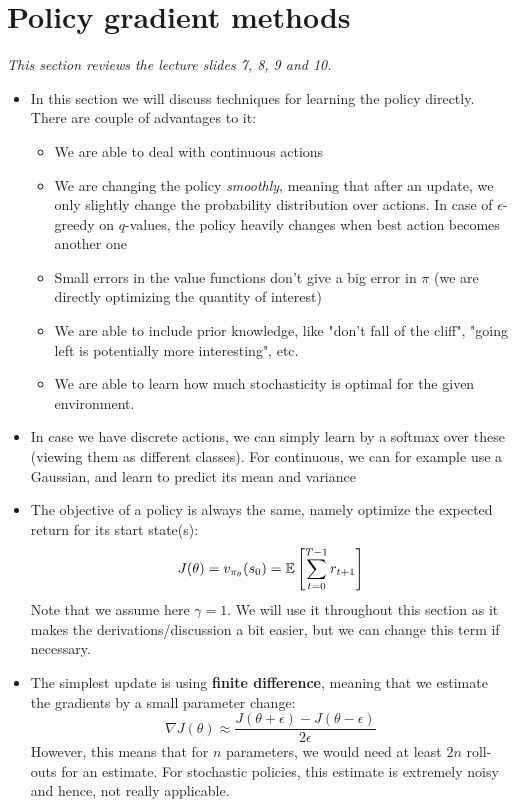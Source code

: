 \section{Policy gradient methods}
\label{sec:policy_learning}
\textit{This section reviews the lecture slides 7, 8, 9 and 10.}
\begin{itemize}
	\item In this section we will discuss techniques for learning the policy directly. There are couple of advantages to it:
	\begin{itemize}
		\item We are able to deal with continuous actions
		\item We are changing the policy \textit{smoothly}, meaning that after an update, we only slightly change the probability distribution over actions. In case of $\epsilon$-greedy on $q$-values, the policy heavily changes when best action becomes another one
		\item Small errors in the value functions don't give a big error in $\pi$ (we are directly optimizing the quantity of interest)
		\item We are able to include prior knowledge, like "don't fall of the cliff", "going left is potentially more interesting", etc.
		\item We are able to learn how much stochasticity is optimal for the given environment. 
	\end{itemize}
	\item In case we have discrete actions, we can simply learn by a softmax over these (viewing them as different classes). For continuous, we can for example use a Gaussian, and learn to predict its mean and variance
	\item The objective of a policy is always the same, namely optimize the expected return for its start state(s): $$J(\theta)=v_{\pi_{\theta}}(s_0)=\mathbb{E}\left[\sum_{t=0}^{T-1} r_{t+1}\right]$$
	Note that we assume here $\gamma=1$. We will use it throughout this section as it makes the derivations/discussion a bit easier, but we can change this term if necessary.
	\item The simplest update is using \textbf{finite difference}, meaning that we estimate the gradients by a small parameter change:
	$$\nabla J(\theta)\approx \frac{ J(\theta+\epsilon) - J(\theta-\epsilon)}{2\epsilon}$$
	However, this means that for $n$ parameters, we would need at least $2n$ roll-outs for an estimate. For stochastic policies, this estimate is extremely noisy and hence, not really applicable.
\end{itemize}
